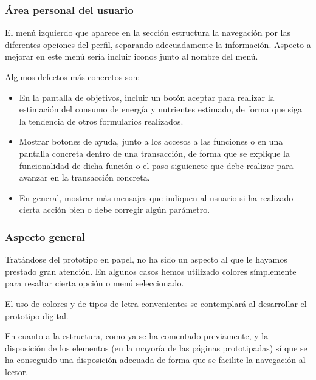\documentclass[a4paper]{article}
\begin{document}
\subsubsection*{Área personal del usuario}

El menú izquierdo que aparece en la sección estructura la navegación por las diferentes opciones del perfil, separando adecuadamente la información. Aspecto a mejorar en este menú sería incluir iconos junto al nombre del menú.

Algunos defectos más concretos son:

	\begin{itemize}
		\item	En la pantalla de objetivos, incluir un botón aceptar para realizar la estimación del consumo de energía y nutrientes estimado, de forma que siga la tendencia de otros formularios realizados.
		\item	Mostrar botones de ayuda, junto a los accesos a las funciones o en una pantalla concreta dentro de una transacción, de forma que se explique la funcionalidad de dicha función o el paso siguienete que debe realizar para avanzar en la transacción concreta.
		\item	En general, mostrar más mensajes que indiquen al usuario si ha realizado cierta acción bien o debe corregir algún parámetro.
	\end{itemize}

\subsubsection*{Aspecto general}

Tratándose del prototipo en papel, no ha sido un aspecto al que le hayamos prestado gran atención. En algunos casos hemos utilizado colores símplemente para resaltar cierta opción o menú seleccionado.

El uso de colores y de tipos de letra convenientes se contemplará al desarrollar el prototipo digital.

En cuanto a la estructura, como ya se ha comentado previamente, y la disposición de los elementos (en la mayoría de las páginas prototipadas) sí que se ha conseguido una disposición adecuada de forma que se facilite la navegación al lector.
\end{document}
